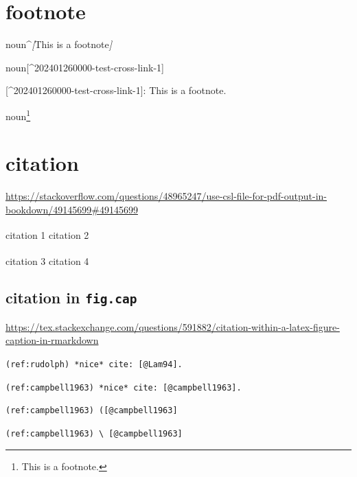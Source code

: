 \documentclass[
]{book}
\newenvironment{Shaded}{\begin{snugshade}}{\end{snugshade}}
\newcommand{\CommentTok}[1]{\textcolor[rgb]{0.56,0.35,0.01}{\textit{#1}}}
\newcommand{\NormalTok}[1]{#1}
\newcommand{\OtherTok}[1]{\textcolor[rgb]{0.56,0.35,0.01}{#1}}
\theoremstyle{definition}
\theoremstyle{definition}
\theoremstyle{definition}
\theoremstyle{definition}
\theoremstyle{remark}
\begin{document}
\section{footnote}\label{footnote-1}

\begin{Shaded}
\begin{Highlighting}[]
\NormalTok{noun\^{}}\CommentTok{[}\OtherTok{This is a footnote}\CommentTok{]}

\NormalTok{noun}\OtherTok{[\^{}202401260000{-}test{-}cross{-}link{-}1]}

\OtherTok{[\^{}202401260000{-}test{-}cross{-}link{-}1]: }\NormalTok{This is a footnote.}
\end{Highlighting}
\end{Shaded}

noun\footnote{This is a footnote.}

\section{citation}\label{citation}

\url{https://stackoverflow.com/questions/48965247/use-csl-file-for-pdf-output-in-bookdown/49145699\#49145699}

citation 1\textsuperscript{} citation 2\textsuperscript{}

citation 3\textsuperscript{} citation 4\textsuperscript{}

\subsection{\texorpdfstring{citation in \texttt{fig.cap}}{citation in fig.cap}}\label{citation-in-fig.cap}

\url{https://tex.stackexchange.com/questions/591882/citation-within-a-latex-figure-caption-in-rmarkdown}

\texttt{(ref:rudolph)\ *nice*\ cite:\ {[}@Lam94{]}.}

\texttt{(ref:campbell1963)\ *nice*\ cite:\ {[}@campbell1963{]}.}

\texttt{(ref:campbell1963)\ ({[}@campbell1963{]}}

\texttt{(ref:campbell1963)\ \textbackslash{}\ {[}@campbell1963{]}}
\end{document}
